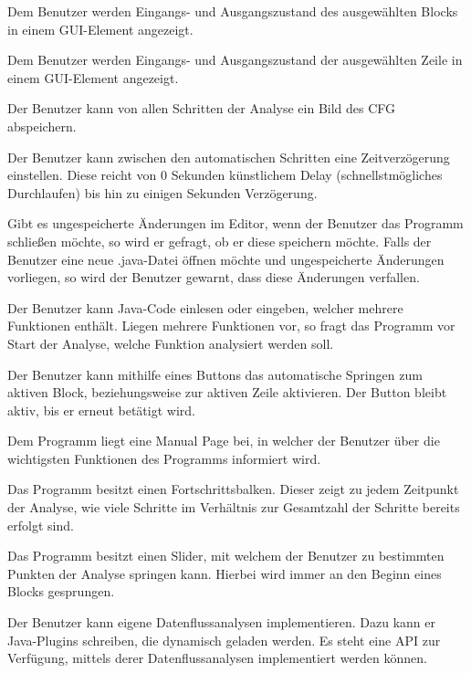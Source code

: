 Dem Benutzer werden Eingangs- und Ausgangszustand des ausgewählten Blocks in einem GUI-Element angezeigt.

Dem Benutzer werden Eingangs- und Ausgangszustand der ausgewählten Zeile in einem GUI-Element angezeigt.

Der Benutzer kann von allen Schritten der Analyse ein Bild des CFG abspeichern.

Der Benutzer kann zwischen den automatischen Schritten eine Zeitverzögerung einstellen. Diese reicht von 0 Sekunden künstlichem Delay (schnellstmögliches Durchlaufen) bis hin zu einigen Sekunden Verzögerung.

Gibt es ungespeicherte Änderungen im Editor, wenn der Benutzer das Programm schließen möchte, so wird er gefragt, ob er diese speichern möchte.
Falls der Benutzer eine neue .java-Datei öffnen möchte und ungespeicherte Änderungen vorliegen, so wird der Benutzer gewarnt, dass diese Änderungen verfallen.

Der Benutzer kann Java-Code einlesen oder eingeben, welcher mehrere Funktionen
enthält. Liegen mehrere Funktionen vor, so fragt das Programm vor Start der Analyse, welche Funktion analysiert werden soll.

Der Benutzer kann mithilfe eines Buttons das automatische Springen zum aktiven Block, beziehungsweise zur aktiven Zeile aktivieren. Der Button bleibt aktiv, bis er erneut betätigt wird.

Dem Programm liegt eine Manual Page bei, in welcher der Benutzer über die wichtigsten Funktionen des Programms informiert wird.

Das Programm besitzt einen Fortschrittsbalken. Dieser zeigt zu jedem Zeitpunkt der Analyse, wie viele Schritte im Verhältnis zur Gesamtzahl der Schritte bereits erfolgt sind.

Das Programm besitzt einen Slider, mit welchem der Benutzer zu bestimmten Punkten der Analyse springen kann. Hierbei wird immer an den Beginn eines Blocks gesprungen.

Der Benutzer kann eigene Datenflussanalysen implementieren. Dazu kann er Java-Plugins schreiben, die dynamisch geladen werden. Es steht eine API zur Verfügung, mittels derer Datenflussanalysen implementiert werden können.